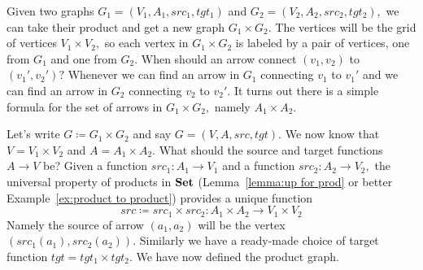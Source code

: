 \documentclass[../main/CT4S-EN-RU]{subfiles}
\begin{document}
\begin{exampleENG}\label{ex:product of graphs}
Given two graphs $G_1=(V_1,A_1,src_1,tgt_1)$ and $G_2=(V_2,A_2,src_2,tgt_2),$ we can take their product and get a new graph $G_1\times G_2.$ The vertices will be the grid of vertices $V_1\times V_2,$ so each vertex in $G_1\times G_2$ is labeled by a pair of vertices, one from $G_1$ and one from $G_2.$ When should an arrow connect $(v_1,v_2)$ to $(v_1',v_2')?$ Whenever we can find an arrow in $G_1$ connecting $v_1$ to $v_1'$ and we can find an arrow in $G_2$ connecting $v_2$ to $v_2'.$ It turns out there is a simple formula for the set of arrows in $G_1\times G_2,$ namely $A_1\times A_2.$

Let's write $G{\coloneqq}G_1\times G_2$ and say $G=(V,A,src,tgt).$ We now know that $V=V_1\times V_2$ and $A=A_1\times A_2.$ What should the source and target functions $A{→} V$ be? Given a function $src_1\colon A_1{→} V_1$ and a function $src_2\colon A_2{→} V_2,$ the universal property of products in ${\mathbf{Set}}$ (Lemma~\ref{lemma:up for prod} or better Example~\ref{ex:product to product}) provides a unique function 
$$src{\coloneqq}src_1\times src_2\colon A_1\times A_2{→} V_1\times V_2$$ 
Namely the source of arrow $(a_1,a_2)$ will be the vertex $(src_1(a_1),src_2(a_2)).$ Similarly we have a ready-made choice of target function $tgt=tgt_1\times tgt_2.$ We have now defined the product graph.


\end{exampleENG}
\end{document}
